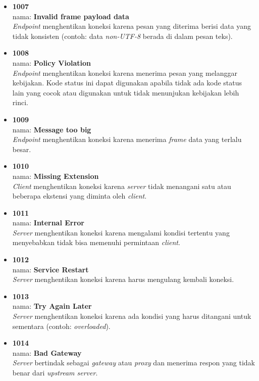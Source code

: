 \documentclass[a4paper,twoside]{article}
\begin{document}
\begin{enumerate}
\begin{enumerate}
\begin{itemize}
				\item \textbf{1007} \\ nama: \textbf{Invalid frame payload data} \\ \textit{Endpoint} menghentikan koneksi karena pesan yang diterima berisi data yang tidak konsisten (contoh: data \textit{non-UTF-8} berada di dalam pesan teks).
				
				\item \textbf{1008} \\ nama: \textbf{Policy Violation} \\ \textit{Endpoint} menghentikan koneksi karena menerima pesan yang melanggar kebijakan. Kode status ini dapat digunakan apabila tidak ada kode status lain yang cocok atau digunakan untuk tidak menunjukan kebijakan lebih rinci.
				
				\item \textbf{1009} \\ nama: \textbf{Message too big} \\ \textit{Endpoint} menghentikan koneksi karena menerima \textit{frame} data yang terlalu besar.
				
				\item \textbf{1010} \\ nama: \textbf{Missing Extension} \\ \textit{Client} menghentikan koneksi karena \textit{server} tidak menangani satu atau beberapa ekstensi yang diminta oleh \textit{client}.
				
				\item \textbf{1011} \\ nama: \textbf{Internal Error} \\ \textit{Server} menghentikan koneksi karena mengalami kondisi tertentu yang menyebabkan tidak bisa memenuhi permintaan \textit{client}.
				
				\item \textbf{1012} \\ nama: \textbf{Service Restart} \\ \textit{Server} menghentikan koneksi karena harus mengulang kembali koneksi.
				
				\item \textbf{1013} \\ nama: \textbf{Try Again Later} \\ \textit{Server} menghentikan koneksi karena ada kondisi yang harus ditangani untuk sementara (contoh: \textit{overloaded}).
				
				\item \textbf{1014} \\ nama: \textbf{Bad Gateway} \\ \textit{Server} bertindak sebagai \textit{gateway} atau \textit{proxy} dan menerima respon yang tidak benar dari \textit{upstream server}.
				

\end{itemize}
\end{enumerate}
\end{enumerate}
\end{document}
